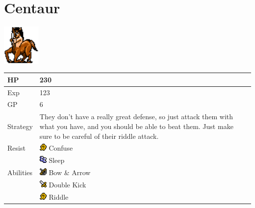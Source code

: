 \section{Centaur}
\label{monster:centaur}

\includegraphics[height=2cm,keepaspectratio]{./resources/monster/centaur}

\begin{longtable}{ l p{9cm} }
	HP
	& 230
\\ \hline
	Exp
	& 123
\\ \hline
	GP
	& 6
\\ \hline
	Strategy
	& They don't have a really great defense, so just attack them with what you have, and you should be able to beat them. Just make sure to be careful of their riddle attack.
\\ \hline
	Resist
	& \includegraphics[height=1em,keepaspectratio]{./resources/effects/confusion} Confuse \\
	& \includegraphics[height=1em,keepaspectratio]{./resources/effects/sleep} Sleep
\\ \hline
	Abilities
	& \includegraphics[height=1em,keepaspectratio]{./resources/effects/shoot} Bow \& Arrow \\
	& \includegraphics[height=1em,keepaspectratio]{./resources/effects/damage} Double Kick \\
	& \includegraphics[height=1em,keepaspectratio]{./resources/effects/confusion} Riddle
\end{longtable}
